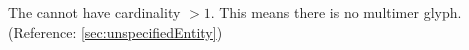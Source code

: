 The  cannot have cardinality $>
  1$. This means there is no multimer glyph.
  (Reference: \ref{sec:unspecifiedEntity})